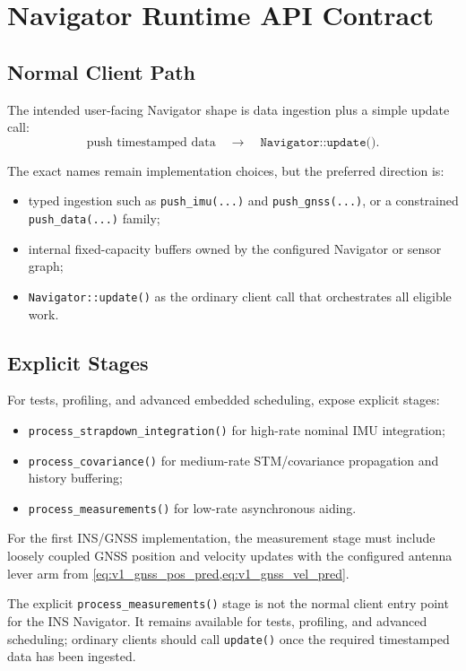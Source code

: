 \chapter{Navigator Runtime API Contract}

\section{Normal Client Path}

The intended user-facing Navigator shape is data ingestion plus a simple update
call:
\begin{equation*}
\text{push timestamped data} \quad \rightarrow \quad \texttt{Navigator::update()}.
\end{equation*}

The exact names remain implementation choices, but the preferred direction is:
\begin{itemize}
    \item typed ingestion such as \texttt{push\_imu(...)} and
    \texttt{push\_gnss(...)}, or a constrained \texttt{push\_data(...)} family;
    \item internal fixed-capacity buffers owned by the configured Navigator or
    sensor graph;
    \item \texttt{Navigator::update()} as the ordinary client call that
    orchestrates all eligible work.
\end{itemize}

\section{Explicit Stages}

For tests, profiling, and advanced embedded scheduling, expose explicit stages:
\begin{itemize}
    \item \texttt{process\_strapdown\_integration()} for high-rate nominal IMU
    integration;
    \item \texttt{process\_covariance()} for medium-rate STM/covariance
    propagation and history buffering;
    \item \texttt{process\_measurements()} for low-rate asynchronous aiding.
\end{itemize}
For the first INS/GNSS implementation, the measurement stage must include
loosely coupled GNSS position and velocity updates with the configured antenna
lever arm from \cref{eq:v1_gnss_pos_pred,eq:v1_gnss_vel_pred}.

The explicit \texttt{process\_measurements()} stage is not the normal client
entry point for the INS Navigator. It remains available for tests, profiling,
and advanced scheduling; ordinary clients should call \texttt{update()} once
the required timestamped data has been ingested.

